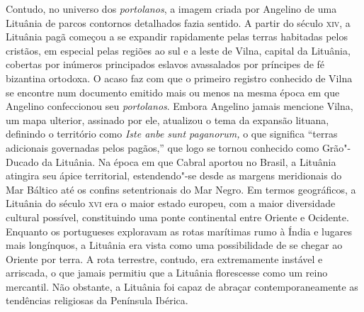 Contudo, no universo dos \textit{portolanos}, a imagem criada por Angelino de uma
Lituânia de parcos contornos detalhados fazia sentido. A partir do
século \textsc{xiv}, a Lituânia pagã começou a se expandir rapidamente pelas
terras habitadas pelos cristãos, em especial pelas regiões ao sul e a
leste de Vilna, capital da Lituânia, cobertas por inúmeros principados
eslavos avassalados por príncipes de fé bizantina ortodoxa. O acaso faz
com que o primeiro registro conhecido de Vilna se encontre num documento
emitido mais ou menos na mesma época em que Angelino confeccionou seu
\textit{portolanos}. Embora Angelino jamais mencione Vilna, um mapa ulterior,
assinado por ele, atualizou o tema da expansão lituana, definindo o
território como \textit{Iste anbe sunt paganorum,} o que significa
``terras adicionais governadas pelos pagãos,'' que logo se tornou
conhecido como Grão"-Ducado da Lituânia. Na época em que Cabral aportou
no Brasil, a Lituânia atingira seu ápice territorial, estendendo"-se
desde as margens meridionais do Mar Báltico até os confins setentrionais
do Mar Negro. Em termos geográficos, a Lituânia do século \textsc{xvi} era o maior
estado europeu, com a maior diversidade cultural possível, constituindo
uma ponte continental entre Oriente e Ocidente. Enquanto os portugueses
exploravam as rotas marítimas rumo à Índia e lugares mais longínquos, a
Lituânia era vista como uma possibilidade de se chegar ao Oriente por
terra. A rota terrestre, contudo, era extremamente instável e arriscada,
o que jamais permitiu que a Lituânia florescesse como um reino
mercantil. Não obstante, a Lituânia foi capaz de abraçar
contemporaneamente as tendências religiosas da Península Ibérica.

